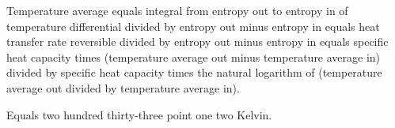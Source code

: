 Temperature average equals integral from entropy out to entropy in of temperature differential divided by entropy out minus entropy in equals heat transfer rate reversible divided by entropy out minus entropy in equals specific heat capacity times (temperature average out minus temperature average in) divided by specific heat capacity times the natural logarithm of (temperature average out divided by temperature average in).

Equals two hundred thirty-three point one two Kelvin.